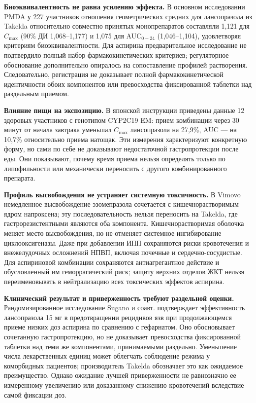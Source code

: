 \documentclass[11pt,a4paper,notitlepage]{report}
\newcommand{\src}[1]{\unskip\space\cite{#1}}
\begin{document}
\textbf{Биоэквивалентность не равна усилению эффекта.} В основном исследовании PMDA у 227 участников отношения геометрических средних для лансопразола из Takelda относительно совместно принятых монопрепаратов составляли 1,121 для $C_{\max}$ (90\% ДИ 1,068--1,177) и 1,075 для AUC$_{0-24}$ (1,046--1,104), удовлетворяя критериям биоэквивалентности. Для аспирина предварительное исследование не подтвердило полный набор фармакокинетических критериев; регуляторное обоснование дополнительно опиралось на сопоставление профилей растворения. Следовательно, регистрация не доказывает полной фармакокинетической идентичности обоих компонентов или превосходства фиксированной таблетки над раздельным приемом.\src{fdctakeldareview}

\textbf{Влияние пищи на экспозицию.} В японской инструкции приведены данные 12 здоровых участников с генотипом CYP2C19 EM: прием комбинации через 30 минут от начала завтрака уменьшал $C_{\max}$ лансопразола на 27,9\%, AUC --- на 10,7\% относительно приема натощак. Эти измерения характеризуют конкретную форму, но сами по себе не доказывают недостаточной гастропротекции после еды. Они показывают, почему время приема нельзя определять только по липофильности или механически переносить с другого комбинированного препарата.\src{fdctakeldalabel}

\textbf{Профиль высвобождения не устраняет системную токсичность.} В Vimovo немедленное высвобождение эзомепразола сочетается с кишечнорастворимым ядром напроксена; эту последовательность нельзя переносить на Takelda, где гастрорезистентными являются оба компонента. Кишечнорастворимая оболочка меняет место высвобождения, но не отменяет системное ингибирование циклооксигеназы. Даже при добавлении ИПП сохраняются риски кровотечения и внежелудочных осложнений НПВП, включая почечные и сердечно-сосудистые.\src{fdcvimovo,fdcnaprapac} Для аспириновой комбинации сохраняются антиагрегантное действие и обусловленный им геморрагический риск; защиту верхних отделов ЖКТ нельзя переименовывать в нейтрализацию всех токсических эффектов аспирина.\src{fdctakeldalabel}

\textbf{Клинический результат и приверженность требуют раздельной оценки.} Рандомизированное исследование Sugano и соавт. подтверждает эффективность лансопразола 15 мг в предотвращении рецидивов язв при продолжающемся приеме низких доз аспирина по сравнению с гефарнатом. Оно обосновывает сочетанную гастропротекцию, но не доказывает превосходства фиксированной таблетки над теми же компонентами, принимаемыми раздельно.\src{aspirin15} Уменьшение числа лекарственных единиц может облегчать соблюдение режима у коморбидных пациентов; производитель Takelda обозначает это как ожидаемое преимущество. Однако ожидание лучшей приверженности не равнозначно ее измеренному увеличению или доказанному снижению кровотечений вследствие самой фиксации доз.\src{fdctakeldalaunch}
\end{document}
